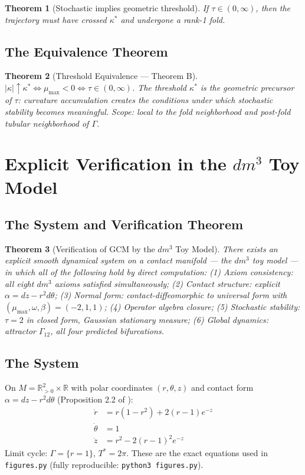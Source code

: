 \documentclass[11pt]{article}
\theoremstyle{boxed}
\newtheorem{theorem}{Theorem}[section]
\begin{document}
\begin{theorem}[Stochastic implies geometric threshold]
If $\tau \in (0,\infty)$, then the trajectory must have crossed $\kappa^{*}$ and
undergone a rank-1 fold.
\end{theorem}

\subsection{The Equivalence Theorem}

\begin{theorem}[Threshold Equivalence --- Theorem B]
$|\kappa| \uparrow \kappa^{*} \iff \mu_{\max} < 0 \iff \tau \in (0,\infty)$. The
threshold $\kappa^{*}$ is the geometric precursor of $\tau$: curvature accumulation
creates the conditions under which stochastic stability becomes meaningful.
Scope: local to the fold neighborhood and post-fold tubular neighborhood of $\Gamma$.
\end{theorem}

\section{Explicit Verification in the $dm^3$ Toy Model}

\subsection{The System and Verification Theorem}

\begin{theorem}[Verification of GCM by the $dm^3$ Toy Model]
There exists an explicit smooth dynamical system on a contact manifold --- the $dm^3$
toy model --- in which all of the following hold by direct computation:
(1) Axiom consistency: all eight $dm^3$ axioms satisfied simultaneously;
(2) Contact structure: explicit $\alpha = dz - r^{2}d\theta$;
(3) Normal form: contact-diffeomorphic to universal form with $(\mu_{\max}, \omega, \beta) = (-2, 1, 1)$;
(4) Operator algebra closure;
(5) Stochastic stability: $\tau = 2$ in closed form, Gaussian stationary measure;
(6) Global dynamics: attractor $\Gamma_{12}$, all four predicted bifurcations.
\end{theorem}

\subsection{The System}

On $M = \mathbb{R}^{2}_{>0} \times \mathbb{R}$ with polar coordinates $(r, \theta, z)$
and contact form $\alpha = dz - r^{2}d\theta$ (Proposition 2.2 of \cite{dm3}):
\begin{align}
\dot{r} &= r(1 - r^{2}) + 2(r - 1)e^{-z} \label{eq:r}\\
\dot{\theta} &= 1 \label{eq:theta}\\
\dot{z} &= r^{2} - 2(r - 1)^{2}e^{-z} \label{eq:z}
\end{align}
Limit cycle: $\Gamma = \{r = 1\}$, $T^{*} = 2\pi$. These are the exact equations used in
\texttt{figures.py} (fully reproducible: \texttt{python3 figures.py}).
\end{document}
